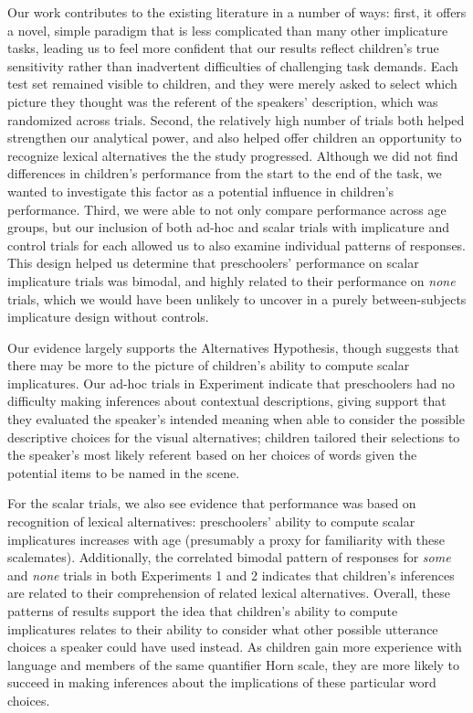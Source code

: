 \documentclass[10pt,letterpaper]{article}
\begin{document}
Our work contributes to the existing literature in a number of ways: first, it offers a novel, simple paradigm that is less complicated than many other implicature tasks, leading us to feel more confident that our results reflect children's true sensitivity rather than inadvertent difficulties of challenging task demands.  Each test set remained visible to children, and they were merely asked to select which picture they thought was the referent of the speakers' description, which was randomized across trials. Second, the relatively high number of trials both helped strengthen our analytical power, and also helped offer children an opportunity to recognize lexical alternatives the the study progressed.  Although we did not find differences in children's performance from the start to the end of the task, we wanted to investigate this factor as a potential influence in children's performance. Third, we were able to not only compare performance across age groups, but our inclusion of both ad-hoc and scalar trials with implicature and control trials for each allowed us to also examine individual patterns of responses. This design helped us determine that preschoolers' performance on scalar implicature trials was bimodal, and highly related to their performance on \emph{none} trials, which we would have been unlikely to uncover in a purely between-subjects implicature design without controls. 

Our evidence largely supports the Alternatives Hypothesis, though suggests that there may be more to the picture of children's ability to compute scalar implicatures. Our ad-hoc trials in Experiment indicate that preschoolers had no difficulty making inferences about contextual descriptions, giving support that they evaluated the speaker's intended meaning when able to consider the possible descriptive choices for the visual alternatives; children tailored their selections to the speaker's most likely referent based on her choices of words given the potential items to be named in the scene. 

For the scalar trials, we also see evidence that performance was based on recognition of lexical alternatives: preschoolers' ability to compute scalar implicatures increases with age (presumably a proxy for familiarity with these scalemates). Additionally, the correlated bimodal pattern of responses for \emph{some} and \emph{none} trials in both Experiments 1 and 2 indicates that children's inferences are related to their comprehension of related lexical alternatives. Overall, these patterns of results support the idea that children's ability to compute implicatures relates to their ability to consider what other possible utterance choices a speaker could have used instead.  As children gain more experience with language and members of the same quantifier Horn scale, they are more likely to succeed in making inferences about the implications of these particular word choices. 
\end{document}
